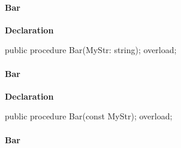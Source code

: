 \documentclass{report}
\newif\ifpdf
\begin{document}
\paragraph*{Bar}\hspace*{\fill}

\label{ok_link_tag_overloads.TOverloadedMethods-Bar}
\begin{list}{}{
\setlength{\itemindent}{0cm}
\setlength{\listparindent}{0cm}
\setlength{\leftmargin}{\evensidemargin}
\addtolength{\leftmargin}{\tmplength}
\settowidth{\labelsep}{X}
\addtolength{\leftmargin}{\labelsep}
\setlength{\labelwidth}{\tmplength}
}
\item[\textbf{Declaration}\hfill]
\ifpdf
\begin{flushleft}
\fi
\begin{ttfamily}
public procedure Bar(MyStr: string); overload;\end{ttfamily}

\ifpdf
\end{flushleft}
\fi

\end{list}
\paragraph*{Bar}\hspace*{\fill}

\label{ok_link_tag_overloads.TOverloadedMethods-Bar}
\begin{list}{}{
\setlength{\itemindent}{0cm}
\setlength{\listparindent}{0cm}
\setlength{\leftmargin}{\evensidemargin}
\addtolength{\leftmargin}{\tmplength}
\settowidth{\labelsep}{X}
\addtolength{\leftmargin}{\labelsep}
\setlength{\labelwidth}{\tmplength}
}
\item[\textbf{Declaration}\hfill]
\ifpdf
\begin{flushleft}
\fi
\begin{ttfamily}
public procedure Bar(const MyStr); overload;\end{ttfamily}

\ifpdf
\end{flushleft}
\fi

\end{list}
\paragraph*{Bar}\hspace*{\fill}
\end{document}
